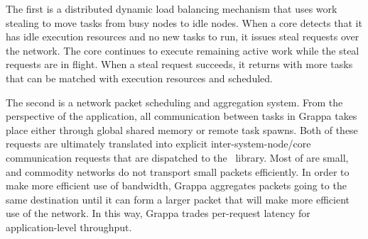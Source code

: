 The first is a distributed dynamic load balancing mechanism that uses work stealing to
move tasks from busy nodes to idle nodes. When a core detects that it
has idle execution resources and no new tasks to run, it issues steal
requests over the network. The core continues to execute remaining
active work while the steal requests are in flight. When a steal
request succeeds, it returns with more tasks that can be matched with
execution resources and scheduled.

The second is a network packet scheduling and aggregation system. From
the perspective of the application, all communication between tasks in
Grappa takes place either through global shared memory or remote task
spawns. Both of these requests are ultimately translated into explicit
inter-system-node/core communication requests that are dispatched to
the \gasnet~library. Most of  are small, and commodity
networks do not transport small packets efficiently. In order to make
more efficient use of bandwidth, Grappa aggregates packets going to the
same destination until it can form a larger packet that will make more
efficient use of the network. In this way, Grappa trades per-request
latency for application-level throughput. 
